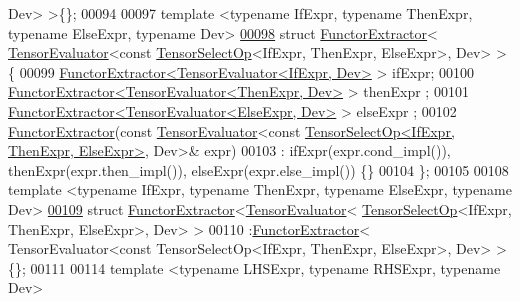 \begin{DoxyCode}
      Dev> >\{\};
00094 
00097 \textcolor{keyword}{template} <\textcolor{keyword}{typename} IfExpr, \textcolor{keyword}{typename} ThenExpr, \textcolor{keyword}{typename} ElseExpr, \textcolor{keyword}{typename} Dev>
\hyperlink{struct_eigen_1_1_tensor_sycl_1_1internal_1_1_functor_extractor_3_01_tensor_evaluator_3_01const_08443a240f6166215dcd0107fd174ad7c}{00098} \textcolor{keyword}{struct }\hyperlink{struct_eigen_1_1_tensor_sycl_1_1internal_1_1_functor_extractor}{FunctorExtractor}< \hyperlink{struct_eigen_1_1_tensor_evaluator}{TensorEvaluator}<const 
      \hyperlink{class_eigen_1_1_tensor_select_op}{TensorSelectOp}<IfExpr, ThenExpr, ElseExpr>, Dev> > \{
00099   \hyperlink{struct_eigen_1_1_tensor_sycl_1_1internal_1_1_functor_extractor}{FunctorExtractor<TensorEvaluator<IfExpr, Dev>} > ifExpr;
00100   \hyperlink{struct_eigen_1_1_tensor_sycl_1_1internal_1_1_functor_extractor}{FunctorExtractor<TensorEvaluator<ThenExpr, Dev>} > thenExpr
      ;
00101   \hyperlink{struct_eigen_1_1_tensor_sycl_1_1internal_1_1_functor_extractor}{FunctorExtractor<TensorEvaluator<ElseExpr, Dev>} > elseExpr
      ;
00102   \hyperlink{struct_eigen_1_1_tensor_sycl_1_1internal_1_1_functor_extractor}{FunctorExtractor}(\textcolor{keyword}{const} \hyperlink{struct_eigen_1_1_tensor_evaluator}{TensorEvaluator}<\textcolor{keyword}{const} 
      \hyperlink{class_eigen_1_1_tensor_select_op}{TensorSelectOp<IfExpr, ThenExpr, ElseExpr>}, Dev>& expr)
00103   : ifExpr(expr.cond\_impl()), thenExpr(expr.then\_impl()), elseExpr(expr.else\_impl()) \{\}
00104 \};
00105 
00108 \textcolor{keyword}{template} <\textcolor{keyword}{typename} IfExpr, \textcolor{keyword}{typename} ThenExpr, \textcolor{keyword}{typename} ElseExpr, \textcolor{keyword}{typename} Dev>
\hyperlink{struct_eigen_1_1_tensor_sycl_1_1internal_1_1_functor_extractor_3_01_tensor_evaluator_3_01_tensor0670c30e8e5682c1a125c6d24db55784}{00109} \textcolor{keyword}{struct }\hyperlink{struct_eigen_1_1_tensor_sycl_1_1internal_1_1_functor_extractor}{FunctorExtractor}<\hyperlink{struct_eigen_1_1_tensor_evaluator}{TensorEvaluator}<
      \hyperlink{class_eigen_1_1_tensor_select_op}{TensorSelectOp}<IfExpr, ThenExpr, ElseExpr>, Dev> >
00110 :\hyperlink{struct_eigen_1_1_tensor_sycl_1_1internal_1_1_functor_extractor}{FunctorExtractor}< TensorEvaluator<const TensorSelectOp<IfExpr, ThenExpr, ElseExpr>, Dev> >
       \{\};
00111 
00114 \textcolor{keyword}{template} <\textcolor{keyword}{typename} LHSExpr, \textcolor{keyword}{typename} RHSExpr, \textcolor{keyword}{typename} Dev>

\end{DoxyCode}
